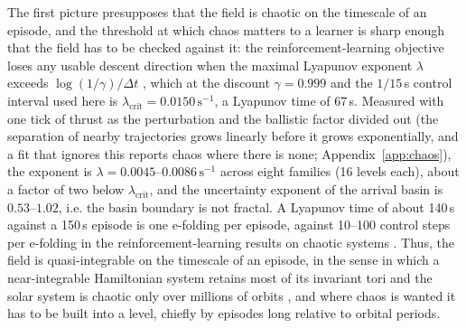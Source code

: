 \documentclass[11pt]{article}
\begin{document}
The first picture presupposes that the field is chaotic on the timescale of
an episode, and the threshold at which chaos matters to a learner is sharp
enough that the field has to be checked against it: the
reinforcement-learning objective loses any usable descent direction when the
maximal Lyapunov exponent $\lambda$ exceeds $\log(1/\gamma)/\Delta t$
\cite{wang2023}, which at the discount $\gamma = 0.999$ and the $1/15$\,s
control interval used here is $\lambda_{\mathrm{crit}} = 0.0150\,\mathrm{s}^{-1}$,
a Lyapunov time of 67\,s. Measured with one tick of thrust as the
perturbation and the ballistic factor divided out (the separation of nearby
trajectories grows linearly before it grows exponentially, and a fit that
ignores this reports chaos where there is none; Appendix~\ref{app:chaos}),
the exponent is $\lambda = 0.0045$--$0.0086\,\mathrm{s}^{-1}$ across eight
families (16 levels each), about a factor of two below
$\lambda_{\mathrm{crit}}$, and the uncertainty exponent of the arrival basin
\cite{grebogi1983,mcdonald1985} is $0.53$--$1.02$, i.e. the basin boundary
is not fractal. A Lyapunov time of about 140\,s against a 150\,s episode is
one e-folding per episode, against 10--100 control steps per e-folding in
the reinforcement-learning results on chaotic systems
\cite{bucci2019,rabault2019,vignon2023}. Thus, the field is
quasi-integrable on the timescale of an episode, in the sense in which a
near-integrable Hamiltonian system retains most of its invariant tori
\cite{kolmogorov1954,arnold1963,nekhoroshev1977} and the solar system is
chaotic only over millions of orbits \cite{laskar1989,sussman1992}, and
where chaos is wanted it has to be built into a level, chiefly by episodes
long relative to orbital periods.
\end{document}
